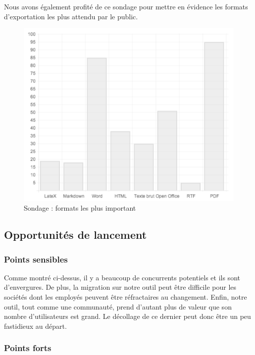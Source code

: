 \documentclass[10pt,twocolumn,a4paper,utf8x]{article}
\begin{document}
Nous avons également profité de ce sondage pour mettre en évidence les
formats d'exportation les plus attendu par le public.

\begin{figure}[htbp]
\centering
\includegraphics[width=\hsize]{sondageFormats.png}
\caption{Sondage : formats les plus important}
\end{figure}

\subsection{Opportunités de lancement}

\subsubsection{Points sensibles}

Comme montré ci-dessus, il y a beaucoup de concurrents potentiels et ils
sont d'envergures. De plus, la migration sur notre outil peut être
difficile pour les sociétés dont les employés peuvent être réfractaires
au changement. Enfin, notre outil, tout comme une communauté, prend
d'autant plus de valeur que son nombre d'utilisateurs est grand. Le
décollage de ce dernier peut donc être un peu fastidieux au départ.

\subsubsection{Points forts}
\end{document}

